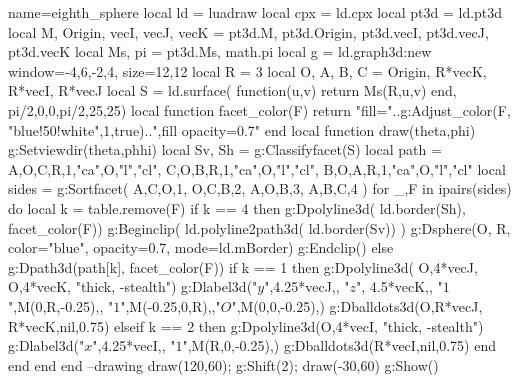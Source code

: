 \documentclass[border=5pt]{standalone}%
\begin{document}
\begin{luadraw}{name=eighth_sphere}
local ld = luadraw
local cpx = ld.cpx
local pt3d = ld.pt3d
local M, Origin, vecI, vecJ, vecK = pt3d.M, pt3d.Origin, pt3d.vecI, pt3d.vecJ, pt3d.vecK
local Ms, pi = pt3d.Ms, math.pi
local g = ld.graph3d:new{ window={-4,6,-2,4}, size={12,12} }
local R = 3
local O, A, B, C = Origin, R*vecK, R*vecI, R*vecJ
local S = ld.surface( function(u,v) return Ms(R,u,v) end, pi/2,0,0,pi/2,{25,25})
local function facet_color(F)
    return "fill="..g:Adjust_color(F, "blue!50!white",1,true)..",fill opacity=0.7"
end
local function draw(theta,phi)
    g:Setviewdir(theta,phhi)
    local Sv, Sh = g:Classifyfacet(S)
    local path = { {A,O,C,R,1,"ca",O,"l","cl"}, {C,O,B,R,1,"ca",O,"l","cl"}, {B,O,A,R,1,"ca",O,"l","cl"} }
    local sides = g:Sortfacet( {{A,C,O,1}, {O,C,B,2}, {A,O,B,3}, {A,B,C,4}} )
    for _,F in ipairs(sides) do
        local k = table.remove(F)
        if k == 4 then
            g:Dpolyline3d( ld.border(Sh), facet_color(F))
            g:Beginclip( ld.polyline2path3d( ld.border(Sv)) )
                g:Dsphere(O, R, {color="blue", opacity=0.7, mode=ld.mBorder})
            g:Endclip()
        else
            g:Dpath3d(path[k], facet_color(F))
            if k == 1 then 
                g:Dpolyline3d( {{O,4*vecJ}, {O,4*vecK}}, "thick, -stealth")
                g:Dlabel3d("$y$",4.25*vecJ,{}, "$z$", 4.5*vecK,{}, "$1$",M(0,R,-0.25),{},
                    "$1$",M(-0.25,0,R),{},"$O$",M(0,0,-0.25),{})
                g:Dballdots3d({O,R*vecJ, R*vecK},nil,0.75)
            elseif k == 2 then 
                g:Dpolyline3d({O,4*vecI}, "thick, -stealth")
                g:Dlabel3d("$x$",4.25*vecI,{}, "$1$",M(R,0,-0.25),{})
                g:Dballdots3d(R*vecI,nil,0.75)
            end
        end
    end
end
--drawing
draw(120,60); g:Shift(2); draw(-30,60)
g:Show()
\end{luadraw}
\end{document}
